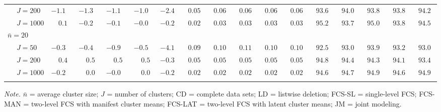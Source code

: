 \begin{sidewaystable}
\begin{threeparttable}
\begin{tabular}{llccccccccccccccc}
 & \nopagebreak $\;J=200$  & ${-}1.1\phantom{0}$ & ${-}1.3\phantom{0}$ & ${-}1.1\phantom{0}$ & ${-}1.0\phantom{0}$ & ${-}2.4\phantom{0}$ & $\phantom{0}0.05\phantom{0}$ & $\phantom{0}0.06\phantom{0}$ & $\phantom{0}0.06\phantom{0}$ & $\phantom{0}0.06\phantom{0}$ & $\phantom{0}0.06\phantom{0}$ & $\phantom{0}93.6\phantom{0}$ & $\phantom{0}94.0\phantom{0}$ & $\phantom{0}93.8\phantom{0}$ & $\phantom{0}93.8\phantom{0}$ & $\phantom{0}94.2\phantom{0}$ \\
 & \nopagebreak $\;J=1000$  & $\phantom{-}0.1\phantom{0}$ & ${-}0.2\phantom{0}$ & ${-}0.1\phantom{0}$ & ${-}0.0\phantom{0}$ & ${-}0.2\phantom{0}$ & $\phantom{0}0.02\phantom{0}$ & $\phantom{0}0.03\phantom{0}$ & $\phantom{0}0.03\phantom{0}$ & $\phantom{0}0.03\phantom{0}$ & $\phantom{0}0.03\phantom{0}$ & $\phantom{0}95.2\phantom{0}$ & $\phantom{0}93.7\phantom{0}$ & $\phantom{0}95.0\phantom{0}$ & $\phantom{0}93.8\phantom{0}$ & $\phantom{0}94.5\phantom{0}$ \\
\multicolumn{4}{l}{$\bar{n}=20$} \\  & \nopagebreak $\;J=50$  & ${-}0.3\phantom{0}$ & ${-}0.4\phantom{0}$ & ${-}0.9\phantom{0}$ & ${-}0.5\phantom{0}$ & ${-}4.1\phantom{0}$ & $\phantom{0}0.09\phantom{0}$ & $\phantom{0}0.10\phantom{0}$ & $\phantom{0}0.11\phantom{0}$ & $\phantom{0}0.10\phantom{0}$ & $\phantom{0}0.10\phantom{0}$ & $\phantom{0}92.5\phantom{0}$ & $\phantom{0}93.0\phantom{0}$ & $\phantom{0}93.9\phantom{0}$ & $\phantom{0}93.2\phantom{0}$ & $\phantom{0}93.0\phantom{0}$ \\
 & \nopagebreak $\;J=200$  & $\phantom{-}0.4\phantom{0}$ & $\phantom{-}0.5\phantom{0}$ & $\phantom{-}0.5\phantom{0}$ & $\phantom{-}0.5\phantom{0}$ & ${-}0.3\phantom{0}$ & $\phantom{0}0.05\phantom{0}$ & $\phantom{0}0.05\phantom{0}$ & $\phantom{0}0.05\phantom{0}$ & $\phantom{0}0.05\phantom{0}$ & $\phantom{0}0.05\phantom{0}$ & $\phantom{0}94.8\phantom{0}$ & $\phantom{0}94.4\phantom{0}$ & $\phantom{0}94.3\phantom{0}$ & $\phantom{0}94.1\phantom{0}$ & $\phantom{0}93.4\phantom{0}$ \\
 & \nopagebreak $\;J=1000$  & ${-}0.2\phantom{0}$ & $\phantom{-}0.0\phantom{0}$ & ${-}0.0\phantom{0}$ & $\phantom{-}0.0\phantom{0}$ & ${-}0.2\phantom{0}$ & $\phantom{0}0.02\phantom{0}$ & $\phantom{0}0.02\phantom{0}$ & $\phantom{0}0.02\phantom{0}$ & $\phantom{0}0.02\phantom{0}$ & $\phantom{0}0.02\phantom{0}$ & $\phantom{0}94.6\phantom{0}$ & $\phantom{0}94.7\phantom{0}$ & $\phantom{0}94.9\phantom{0}$ & $\phantom{0}94.6\phantom{0}$ & $\phantom{0}94.9\phantom{0}$ \\
[0.5ex]\hline\\[-1.6ex] 
\end{tabular}
\begin{tablenotes}{\footnotesize \textit{Note.} $\bar{n}$ = average cluster size; $J$ = number of clusters; CD = complete data sets; LD = listwise deletion; FCS-SL = single-level FCS; FCS-MAN = two-level FCS with manifest cluster means; FCS-LAT = two-level FCS with latent cluster means; JM = joint modeling.}\end{tablenotes}
\end{threeparttable}
\end{sidewaystable}
